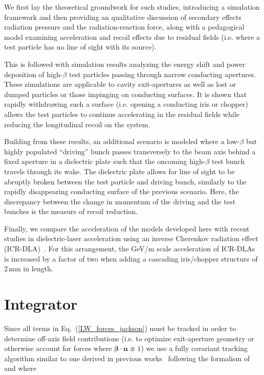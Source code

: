 \documentclass[reprint,
               amsmath,amssymb,nofootinbib, aps%
              ]{revtex4-2}
\begin{document}
We first lay the theoretical groundwork for such studies, introducing a simulation framework and then providing an qualitative discussion of secondary effects radiation pressure and the radiation-reaction force, along with a pedagogical model examining acceleration and recoil effects due to residual fields (i.e. where a test particle has no line of sight with its source).

This is followed with simulation results analyzing the energy shift and power deposition of high-$\beta$ test particles passing through narrow conducting apertures. These simulations are applicable to cavity exit-apertures as well as lost or dumped particles or those impinging on conducting surfaces. It is shown that rapidly withdrawing such a surface (i.e. opening a conducting iris or chopper) allows the test particles to continue accelerating in the residual fields while reducing the longitudinal recoil on the system.

Building from these results, an additional scenario is modeled where a low-$\beta$ but highly populated ``driving'' bunch passes transversely to the beam axis behind a fixed aperture in a dielectric plate such that the oncoming high-$\beta$ test bunch travels through its wake. The dielectric plate allows for line of sight to be abruptly broken between the test particle and driving bunch, similarly to the rapidly disappearing conducting surface of the previous scenario. Here, the discrepancy between the change in momentum of the driving and the test bunches is the measure of recoil reduction.

Finally, we compare the acceleration of the models developed here with recent studies in dielectric-laser acceleration using an inverse Cherenkov radiation effect (ICR-DLA)~\cite{liu_2020}. For this arrangement, the GeV/m scale acceleration of ICR-DLAs is increased by a factor of two when adding a cascading iris/chopper structure of 2\,mm in length.

\section{Integrator}
Since all terms in Eq.~(\ref{LW_forces_jackson}) must be tracked in order to determine off-axis field contributions (i.e. to optimize exit-aperture geometry or otherwise account for forces where $\boldsymbol{\beta}\cdot\mathbf{n}\not\approx 1$) we use a fully covariant tracking algorithm similar to one derived in previous works~\cite{folsom:ipac2021-tupab218,laface_2020_covariant} following the formalism of~\cite{jackson2012classical} and \cite{bordovitsyn_technique_2003} where
\end{document}
